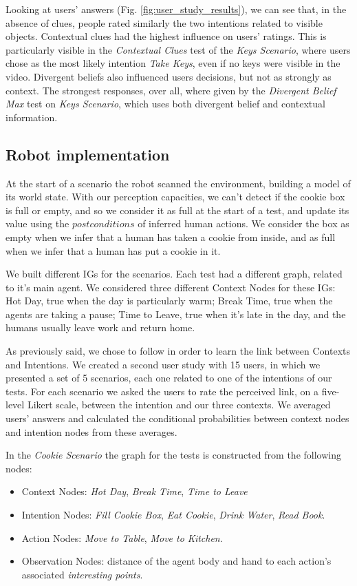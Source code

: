 Looking at users' answers (Fig. \ref{fig:user_study_results}), we can see that, in the absence of clues, people rated similarly the two intentions related to visible objects. Contextual clues had the highest influence on users' ratings. This is particularly visible in the \textit{Contextual Clues} test of the \textit{Keys Scenario}, where users chose as the most likely intention \textit{Take Keys}, even if no keys were visible in the video. Divergent beliefs also influenced users decisions, but not as strongly as context. The strongest responses, over all, where given by the \textit{Divergent Belief Max} test on \textit{Keys Scenario}, which uses both divergent belief and contextual information.

\subsection{Robot implementation}
At the start of a scenario the robot scanned the environment, building a model of its world state. With our perception capacities, we can't detect if the cookie box is full or empty, and so we consider it as full at the start of a test, and update its value using the $postconditions$ of inferred human actions. We consider the box as empty when we infer that a human has taken a cookie from inside, and as full when we infer that a human has put a cookie in it.

We built different IGs for the scenarios. Each test had a different graph, related to it's main agent. We considered three different Context Nodes for these IGs: Hot Day, true when the day is particularly warm; Break Time, true when the agents are taking a pause; Time to Leave, true when it's late in the day, and the humans usually leave work and return home.

As previously said, we chose to follow \cite{Liu2014} in order to learn the link between Contexts and Intentions. We created a second user study with 15 users, in which we presented a set of 5 scenarios, each one related to one of the intentions of our tests. For each scenario we asked the users to rate the perceived link, on a five-level Likert scale, between the intention and our three contexts. We averaged users' answers and calculated the conditional probabilities between context nodes and intention nodes from these averages.


In the \textit{Cookie Scenario} the graph for the tests is constructed from the following nodes:
\begin{itemize}
\item Context Nodes: \textit{Hot Day}, \textit{Break Time}, \textit{Time to Leave}
\item Intention Nodes: \textit{Fill Cookie Box}, \textit{Eat Cookie}, \textit{Drink Water}, \textit{Read Book}.
\item Action Nodes: \textit{Move to Table}, \textit{Move to Kitchen}.
\item Observation Nodes: distance of the agent body and hand to each action's associated \textit{interesting points}.
\end{itemize}

